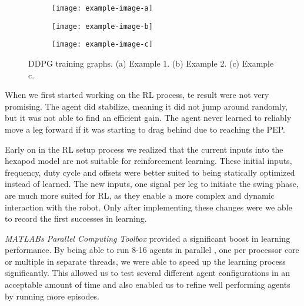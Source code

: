 \begin{figure}[h]
	\begin{subfigure}{.5\textwidth} %
		\centering
		\texttt{[image: example-image-a]}  %
		\caption{}
		\label{figure: RL a}
	\end{subfigure}
	\begin{subfigure}{.5\textwidth}
		\centering
		\texttt{[image: example-image-b]}  
		\caption{}
		\label{figure: RL b}
	\end{subfigure} 
	\begin{subfigure}{\textwidth}
		\centering
		\texttt{[image: example-image-c]}   %
		\caption{}
		\label{figure: RL c}
	\end{subfigure}
	\caption[DDPG training graphs]{DDPG training graphs. (a) Example 1. (b) Example 2. (c) Example c.}
	\label{figure: DDPG learning graphs}
\end{figure}



When we first started working on the RL process, te result were not very promising. The agent did stabilize, meaning it did not jump around randomly, but it was not able to find an efficient gain.
The agent never learned to reliably move a leg forward if it was starting to drag behind due to reaching the PEP.

Early on in the RL setup process we realized that the current inputs into the hexapod model are not suitable for reinforcement learning.
These initial inputs, frequency, duty cycle and offsets were better suited to being statically optimized instead of learned.
The new inputs, one signal per leg to initiate the swing phase, are much more suited for RL, as they enable a more complex and dynamic interaction with the robot.
Only after implementing these changes were we able to record the first successes in learning.


\textit{MATLABs Parallel Computing Toolbox} provided a significant boost in learning performance.
By being able to run 8-16 agents in parallel , one per processor core or multiple in separate threads, we were able to speed up the learning process significantly.
This allowed us to test several different agent configurations in an acceptable amount of time and also enabled us to refine well performing agents by running more episodes.

